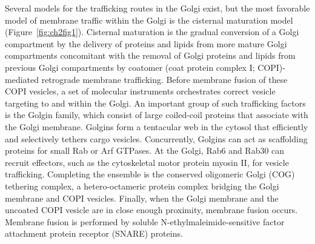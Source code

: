 Several models for the trafficking routes in the Golgi exist, but the most favorable model of membrane traffic within the Golgi is the cisternal maturation model (Figure~\ref{fig:ch2fig1})\cite{glick_membrane_2009}. Cisternal maturation is the gradual conversion of a Golgi compartment by the delivery of proteins and lipids from more mature Golgi compartments concomitant with the removal of Golgi proteins and lipids from previous Golgi compartments by coatomer (coat protein complex I; COPI)-mediated retrograde membrane trafficking\cite{cottam_retrograde_2012,glick_membrane_2009}. Before membrane fusion of these COPI vesicles, a set of molecular instruments orchestrates correct vesicle targeting to and within the Golgi. An important group of such trafficking factors is the Golgin family, which consist of large coiled-coil proteins that associate with the Golgi membrane. Golgins form a tentacular web in the cytosol that efficiently and selectively tethers cargo vesicles\cite{muschalik_golgins_2018,wong_specificity_2014,wong_golgin_2017}. Concurrently, Golgins can act as scaffolding proteins for small Rab or Arf GTPases\cite{drin_asymmetric_2008,fridmann-sirkis_tmf_2004,setty_golgi_2003,kelly}. At the Golgi, Rab6 and Rab30 can recruit effectors, such as the cytoskeletal motor protein myosin II, for vesicle trafficking\cite{kelly_rab30_2012,miserey-lenkei_rab_2010,hayes_multiple_2009,zerial_rab_2001,wandinger-ness_rab_2014}. Completing the ensemble is the conserved oligomeric Golgi (COG) tethering complex, a hetero-octameric protein complex bridging the Golgi membrane and COPI vesicles\cite{lees_molecular_2010,yu_tethering_2010}. Finally, when the Golgi membrane and the uncoated COPI vesicle are in close enough proximity, membrane fusion occurs. Membrane fusion is performed by soluble N-ethylmaleimide-sensitive factor attachment protein receptor (SNARE) proteins.

